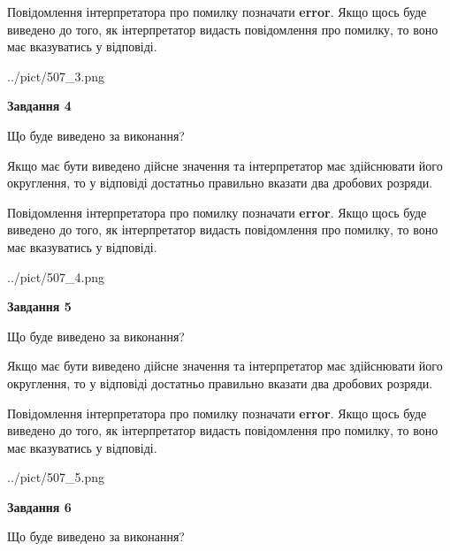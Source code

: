 \documentclass[12pt, ukrainian]{article}
\begin{document}
{\begin {Large}
Повідомлення інтерпретатора про помилку позначати \textbf{error}.
Якщо щось буде виведено до того, як інтерпретатор видасть повідомлення про помилку, 
то воно має вказуватись у відповіді. \par

\begin{center}
	{../pict/507_3.png}
\end{center}
\newpage

{\begin {center}\textbf{Завдання 4}\end {center}}\par
Що буде виведено за виконання? \par

Якщо має бути виведено дійсне значення та інтерпретатор має здійснювати його округлення, 
то у відповіді достатньо правильно вказати два дробових розряди.

Повідомлення інтерпретатора про помилку позначати \textbf{error}.
Якщо щось буде виведено до того, як інтерпретатор видасть повідомлення про помилку, 
то воно має вказуватись у відповіді. \par

\begin{center}
	{../pict/507_4.png}
\end{center}
\newpage

{\begin {center}\textbf{Завдання 5}\end {center}}\par
Що буде виведено за виконання? \par

Якщо має бути виведено дійсне значення та інтерпретатор має здійснювати його округлення, 
то у відповіді достатньо правильно вказати два дробових розряди.

Повідомлення інтерпретатора про помилку позначати \textbf{error}.
Якщо щось буде виведено до того, як інтерпретатор видасть повідомлення про помилку, 
то воно має вказуватись у відповіді. \par

\begin{center}
	{../pict/507_5.png}
\end{center}
\newpage

{\begin {center}\textbf{Завдання 6}\end {center}}\par
Що буде виведено за виконання? \par


\end{Large}}
\end{document}

